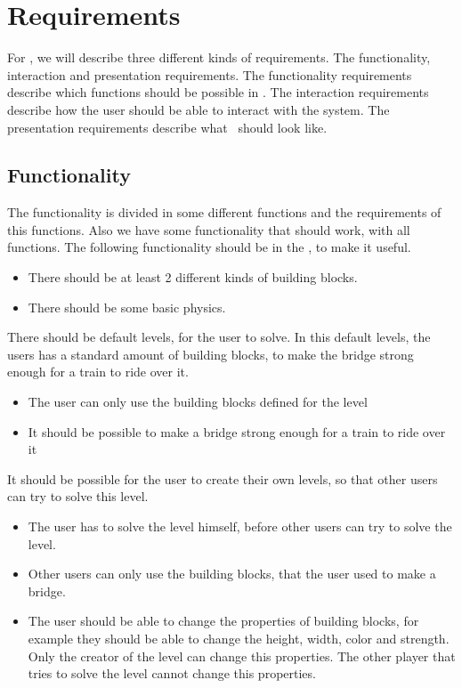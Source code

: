 \section{Requirements}
For  \name, we will describe three different kinds of requirements. The functionality, interaction and presentation requirements. The functionality requirements describe which functions should be possible in \name. The interaction requirements describe how the user should be able to interact with the system. The presentation requirements describe what \name \ should look like. 
 \subsection{Functionality}
 The functionality is divided in some different functions and the requirements of this functions. Also we have some functionality that should work, with all functions.
 The following functionality should be in the \name, to make it useful.
  \begin{itemize}
  \item There should be at least 2 different kinds of building blocks. 
  \item There should be some basic physics.
  \end{itemize}
  There should be default levels, for the user to solve. In this default levels, the users has a standard amount of building blocks, to make the bridge strong enough for a train to ride over it. 
 \begin{itemize}
 \item The user can only use the building blocks defined for the level
 \item It should be possible to make a bridge strong enough for a train to ride over it
 \end{itemize}
  It should be possible for the user to create their own levels, so that other users can try to solve this level. 
 \begin{itemize}
 \item The user has to solve the level himself, before other users can try to solve the level.
 \item Other users can only use the building blocks, that the user used to make a bridge.
 \item The user should be able to change the properties of building blocks, for example they should be able to change the height, width, color and strength. Only the creator of the level can change this properties. The other player that tries to solve the level cannot change this properties.
 \end{itemize}

